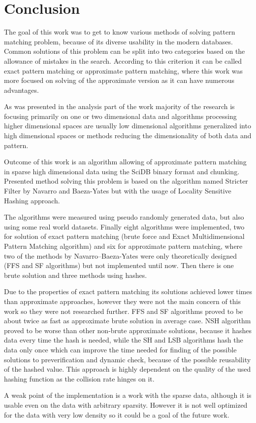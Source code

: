 \chapter{Conclusion}\label{conclusion}
The goal of this work was to get to know various methods of solving pattern matching problem, because of its diverse usability in the modern databases. Common solutions of this problem can be split into two categories based on the allowance of mistakes in the search. According to this criterion it can be called exact pattern matching or approximate pattern matching, where this work was more focused on solving of the approximate version as it can have numerous advantages. 

As was presented in the analysis part of the work majority of the research is focusing primarily on one or two dimensional data and algorithms processing higher dimensional spaces are usually low dimensional algorithms generalized into high dimensional spaces or methods reducing the dimensionality of both data and pattern. 

Outcome of this work is an algorithm allowing of approximate pattern matching in sparse high dimensional data using the SciDB binary format and chunking. Presented method solving this problem is based on the algorithm named Stricter Filter by Navarro and Baeza-Yates but with the usage of Locality Sensitive Hashing approach. 

The algorithms were measured using pseudo randomly generated data, but also using some real world datasets. Finally eight algorithms were implemented, two for solution of exact pattern matching (brute force and Exact Multidimensional Pattern Matching algorithm) and six for approximate pattern matching, where two of the methods by Navarro--Baeza-Yates were only theoretically designed (FFS and SF algorithms) but not implemented until now. Then there is one brute solution and three methods using hashes.

Due to the properties of exact pattern matching its solutions achieved lower times than approximate approaches, however they were not the main concern of this work so they were not researched further.
FFS and SF algorithms proved to be about twice as fast as approximate brute solution in average case.
NSH algorithm proved to be worse than other non-brute approximate solutions, because it hashes data every time the hash is needed, while the SH and LSB algorithms hash the data only once which can improve the time needed for finding of the possible solutions to preverification and dynamic check, because of the possible reusability of the hashed value. This approach is highly dependent on the quality of the used hashing function as the collision rate hinges on it.

A weak point of the implementation is a work with the sparse data, although it is usable even on the data with arbitrary sparsity. However it is not well optimized for the data with very low density so it could be a goal of the future work. 